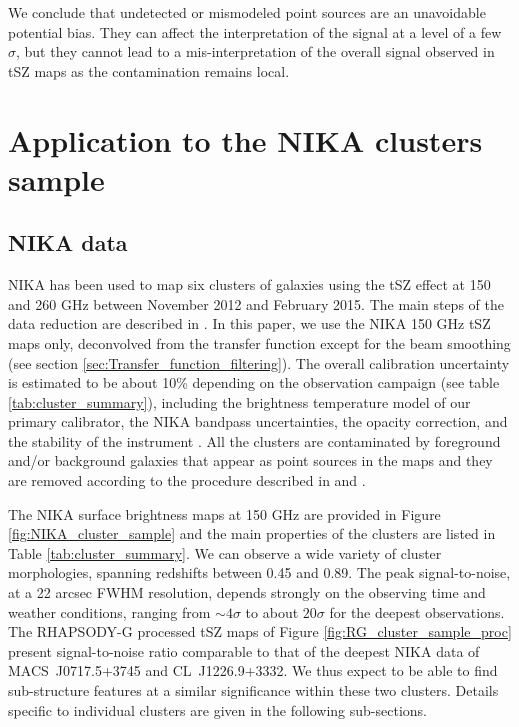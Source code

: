 \documentclass[twocolumn,traditabstract]{aa}
\begin{document}
We conclude that undetected or mismodeled point sources are an unavoidable potential bias. They can affect the interpretation of the signal at a level of a few $\sigma$, but they cannot lead to a mis-interpretation of the overall signal observed in tSZ maps as the contamination remains local.

\section{Application to the NIKA clusters sample}\label{sec:Application_to_the_NIKA_clusters_sample}
\subsection{NIKA data}\label{sec:NIKA_Data}
NIKA has been used to map six clusters of galaxies using the tSZ effect at 150 and 260 GHz between November 2012 and February 2015. The main steps of the data reduction are described in \cite{Adam2014,Adam2015}. In this paper, we use the NIKA 150 GHz tSZ maps only, deconvolved from the transfer function except for the beam smoothing (see section \ref{sec:Transfer_function_filtering}). The overall calibration uncertainty is estimated to be about 10\% depending on the observation campaign (see table \ref{tab:cluster_summary}), including the brightness temperature model of our primary calibrator, the NIKA bandpass uncertainties, the opacity correction, and the stability of the instrument \citep{Catalano2014}. All the clusters are contaminated by foreground and/or background galaxies that appear as point sources in the maps and they are removed according to the procedure described in \cite{Adam2015} and \cite{Adam2016a}. 

The NIKA surface brightness maps at 150 GHz are provided in Figure \ref{fig:NIKA_cluster_sample} and the main properties of the clusters are listed in Table \ref{tab:cluster_summary}. We can observe a wide variety of cluster morphologies, spanning redshifts between 0.45 and 0.89. The peak signal-to-noise, at a 22 arcsec FWHM resolution, depends strongly on the observing time and weather conditions, ranging from $\sim 4 \sigma$ to about $20 \sigma$ for the deepest observations. The RHAPSODY-G processed tSZ maps of Figure \ref{fig:RG_cluster_sample_proc} present signal-to-noise ratio comparable to that of the deepest NIKA data of \mbox{MACS~J0717.5+3745} and \mbox{CL~J1226.9+3332}. We thus expect to be able to find sub-structure features at a similar significance within these two clusters. Details specific to individual clusters are given in the following sub-sections.
\end{document}
